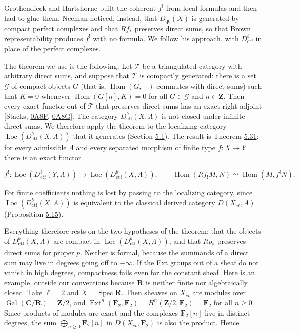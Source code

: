 \documentclass[11pt]{article}
\providecommand{\Ext}{}\renewcommand{\Ext}{\operatorname{Ext}}
\providecommand{\Hom}{}\renewcommand{\Hom}{\operatorname{Hom}}
\providecommand{\Loc}{}\renewcommand{\Loc}{\operatorname{Loc}}
\begin{document}
Grothendieck and Hartshorne built the coherent \(f^!\) from local formulas and then had to glue them. Neeman noticed, instead, that \(D_{\mathrm{qc}}(X)\) is generated by compact perfect complexes and that \(Rf_*\) preserves direct sums, so that Brown representability produces \(f^!\) with no formula. We follow his approach, with \(D^b_{\mathrm{ctf}}\) in place of the perfect complexes.

The theorem we use is the following. Let \(\mathcal T\) be a triangulated category with arbitrary direct sums, and suppose that \(\mathcal T\) is compactly generated: there is a set \(\mathcal G\) of compact objects \(G\) (that is, \(\Hom(G,-)\) commutes with direct sums) such that \(K=0\) whenever \(\Hom(G[n],K)=0\) for all \(G\in\mathcal G\) and \(n\in\mathbf Z\). Then every exact functor out of \(\mathcal T\) that preserves direct sums has an exact right adjoint [Stacks, \href{https://stacks.math.columbia.edu/tag/0A8F}{0A8F}, \href{https://stacks.math.columbia.edu/tag/0A8G}{0A8G}]. The category \(D^b_{\mathrm{ctf}}(X,\Lambda)\) is not closed under infinite direct sums. We therefore apply the theorem to the localizing category \(\Loc(D^b_{\mathrm{ctf}}(X,\Lambda))\) that it generates (Section \hyperref[bp3]{5.1}). The result is Theorem \hyperref[bp100]{5.31}: for every admissible \(\Lambda\) and every separated morphism of finite type \(f:X\to Y\) there is an exact functor

\[
f^!:\Loc(D^b_{\mathrm{ctf}}(Y,\Lambda))\to\Loc(D^b_{\mathrm{ctf}}(X,\Lambda)),
\qquad
\Hom(Rf_!M,N)\simeq\Hom(M,f^!N).
\]

For finite coefficients nothing is lost by passing to the localizing category, since \(\Loc(D^b_{\mathrm{ctf}}(X,A))\) is equivalent to the classical derived category \(D(X_{\acute{e}t},A)\) (Proposition \hyperref[bp48]{5.15}).

Everything therefore rests on the two hypotheses of the theorem: that the objects of \(D^b_{\mathrm{ctf}}(X,\Lambda)\) are compact in \(\Loc(D^b_{\mathrm{ctf}}(X,\Lambda))\), and that \(Rp_*\) preserves direct sums for proper \(p\). Neither is formal, because the summands of a direct sum may live in degrees going off to \(-\infty\). If the Ext groups out of a sheaf do not vanish in high degrees, compactness fails even for the constant sheaf. Here is an example, outside our conventions because \(\mathbf R\) is neither finite nor algebraically closed. Take \(\ell=2\) and \(X=\operatorname{Spec}\mathbf R\). Then sheaves on \(X_{\acute{e}t}\) are modules over \(\operatorname{Gal}(\mathbf C/\mathbf R)=\mathbf Z/2\), and \(\Ext^n(\mathbf F_2,\mathbf F_2)=H^n(\mathbf Z/2,\mathbf F_2)=\mathbf F_2\) for all \(n\geq0\). Since products of modules are exact and the complexes \(\mathbf F_2[n]\) live in distinct degrees, the sum \(\bigoplus_{n\geq0}\mathbf F_2[n]\) in \(D(X_{\acute{e}t},\mathbf F_2)\) is also the product. Hence
\end{document}
